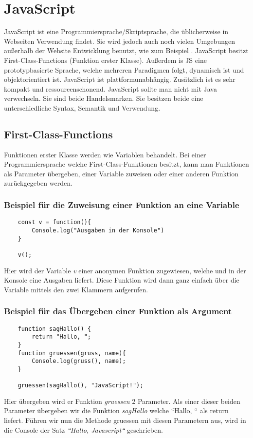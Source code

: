 \section{JavaScript}
\label{js}

JavaScript ist eine Programmiersprache/Skriptsprache, die üblicherweise in Webseiten Verwendung 
findet. Sie wird jedoch auch noch vielen Umgebungen außerhalb der Website Entwicklung benutzt, wie 
zum Beispiel . JavaScript besitzt First-Class-Functions (Funktion erster Klasse). 
Außerdem is JS eine prototypbasierte Sprache, welche mehreren Paradigmen folgt, dynamisch ist und 
objektorientiert ist. JavaScript ist plattformunabhängig. Zusätzlich ist es sehr kompakt und 
ressourcenschonend. JavaScript sollte man nicht mit Java verwechseln. Sie sind beide Handelsmarken. 
Sie besitzen beide eine unterschiedliche Syntax, Semantik und Verwendung.~\cite{JS}

\subsection{First-Class-Functions}
Funktionen erster Klasse werden wie Variablen behandelt. Bei einer Programmiersprache welche 
First-Class-Funktionen besitzt, kann man Funktionen als Parameter übergeben, einer Variable 
zuweisen oder einer anderen Funktion zurückgegeben werden.~\cite{First-Class-Funktion}

\subsubsection{Beispiel für die Zuweisung einer Funktion an eine Variable}
\begin{lstlisting}
    const v = function(){
        Console.log("Ausgaben in der Konsole")
    }

    v();
\end{lstlisting}
Hier wird der Variable \textit{v} einer anonymen Funktion zugewiesen, welche und in der Konsole 
eine Ausgaben liefert. Diese Funktion wird dann ganz einfach über die Variable mittels den zwei 
Klammern aufgerufen.


\subsubsection{Beispiel für das Übergeben einer Funktion als Argument}
\begin{lstlisting}
    function sagHallo() {
        return "Hallo, ";
    }
    function gruessen(gruss, name){
        Console.log(gruss(), name);
    }

    gruessen(sagHallo(), "JavaScript!");
\end{lstlisting}
Hier übergeben wird er Funktion \textit{gruessen} 2 Parameter. Als einer dieser beiden Parameter 
übergeben wir die Funktion \textit{sagHallo} welche ``Hallo, `` als return liefert. Führen wir nun 
die Methode gruessen mit diesen Parametern aus, wird in die Console der Satz 
\textit{``Hallo, Javascript``} geschrieben.

